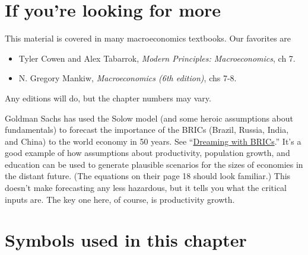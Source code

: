 \begin{enumerate}
\begin{comment}
(iii) Output per worker.
The last step is to make the shift from $K/Y$ to $Y/L$.
We divide the production function by $K$, giving us
\begin{eqnarray*}
    (K/L)^{1-\alpha} &=& A (K/Y)
        \;\;\;\Rightarrow\;\;\;
        K/L \;\;=\;\; \left( \frac{ A s}{g_l + \delta} \right)^{1/(1-\alpha)}.
\end{eqnarray*}

Now we can do the calculations.
With $g_l=0.01$, steady-state output per worker is 1.348.
When $g_l=0.02$, it falls to 1.291, a drop of about 4 percent.
\end{comment}



\end{enumerate}

\section*{If you're looking for more}

This material is covered in many macroeconomics textbooks.
Our favorites are
\begin{itemize}
\item Tyler Cowen and Alex Tabarrok,
{\it Modern Principles: Macroeconomics\/}, ch 7.
\item N. Gregory Mankiw, {\it Macroeconomics (6th edition)\/}, chs 7-8.
\end{itemize}
Any editions will do, but the chapter numbers may vary.


Goldman Sachs has used the Solow model
(and some heroic assumptions about fundamentals) to forecast the importance of
the BRICs (Brazil, Russia, India, and China)
to the world economy in 50 years.
See
``\href{http://www.goldmansachs.com/our-thinking/topics/brics/brics-reports-pdfs/brics-dream.pdf}
{Dreaming with BRICs}.''
It's a good example of how assumptions about productivity, population growth, and education can be used to generate plausible scenarios for the sizes of economies in the distant future.
(The equations on their page 18 should look familiar.)
This doesn't make forecasting any less hazardous, but it tells you
what the critical inputs are.
The key one here, of course, is productivity growth.

\section*{Symbols used in this chapter}

